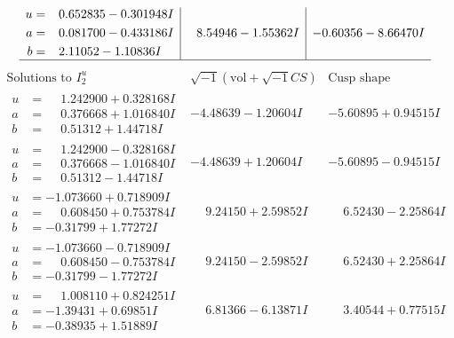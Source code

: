 \documentclass[1p]{elsarticle_modified}
\theoremstyle{definition}
\newcommand{\I}{\sqrt{-1}}
\begin{document}
$$\begin{array}{c|c|c}
\begin{aligned}
u &= \phantom{-}0.652835 - 0.301948 I \\
a &= \phantom{-}0.081700 - 0.433186 I \\
b &= \phantom{-}2.11052 - 1.10836 I\end{aligned}
 & \phantom{-}8.54946 - 1.55362 I & -0.60356 - 8.66470 I\\
 \hline 
 \end{array}$$\newpage$$\begin{array}{c|c|c}  
\text{Solutions to }I^u_{2}& \I (\text{vol} + \sqrt{-1}CS) & \text{Cusp shape}\\
 \hline 
\begin{aligned}
u &= \phantom{-}1.242900 + 0.328168 I \\
a &= \phantom{-}0.376668 + 1.016840 I \\
b &= \phantom{-}0.51312 + 1.44718 I\end{aligned}
 & -4.48639 - 1.20604 I & -5.60895 + 0.94515 I \\ \hline\begin{aligned}
u &= \phantom{-}1.242900 - 0.328168 I \\
a &= \phantom{-}0.376668 - 1.016840 I \\
b &= \phantom{-}0.51312 - 1.44718 I\end{aligned}
 & -4.48639 + 1.20604 I & -5.60895 - 0.94515 I \\ \hline\begin{aligned}
u &= -1.073660 + 0.718909 I \\
a &= \phantom{-}0.608450 + 0.753784 I \\
b &= -0.31799 + 1.77272 I\end{aligned}
 & \phantom{-}9.24150 + 2.59852 I & \phantom{-}6.52430 - 2.25864 I \\ \hline\begin{aligned}
u &= -1.073660 - 0.718909 I \\
a &= \phantom{-}0.608450 - 0.753784 I \\
b &= -0.31799 - 1.77272 I\end{aligned}
 & \phantom{-}9.24150 - 2.59852 I & \phantom{-}6.52430 + 2.25864 I \\ \hline\begin{aligned}
u &= \phantom{-}1.008110 + 0.824251 I \\
a &= -1.39431 + 0.69851 I \\
b &= -0.38935 + 1.51889 I\end{aligned}
 & \phantom{-}6.81366 - 6.13871 I & \phantom{-}3.40544 + 0.77515 I \\ \hline\begin{aligned}

\end{aligned}
\end{array}$$
\end{document}
